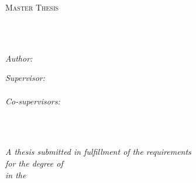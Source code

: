 \documentclass[
11pt, %
oneside, %
english, %
singlespacing, %
headsepline, %
]{MastersDoctoralThesis} %
\author{Hanna \textsc{Pylieva}} %
\begin{document}
\frontmatter %

\pagestyle{plain} %


\begin{titlepage}
\begin{center}

\vspace*{.06\textheight}
{\scshape\LARGE \univname\par}\vspace{1.5cm} %
\textsc{\Large Master Thesis}\\[0.5cm] %

\HRule \\[0.4cm] %
{\huge \bfseries \ttitle\par}\vspace{0.4cm} %
\HRule \\[1.5cm] %
 
\begin{minipage}[t]{0.4\textwidth}
\begin{flushleft} \large
\emph{Author:}\\
{\authorname} %
\end{flushleft}
\end{minipage}
\begin{minipage}[t]{0.4\textwidth}
\begin{flushright} \large
\emph{Supervisor:} \\
{\supname} %
\vfill
\ \\
\emph{Co-supervisors:} \\
{\cosupname}\\
{\seccosupname}
\end{flushright}
\end{minipage}\\[1cm]
 
\vfill

\large \textit{A thesis submitted in fulfillment of the requirements\\ for the degree of \degreename}\\[0.3cm] %
\textit{in the}\\[0.4cm]
\groupname\\\deptname\\[1cm] %
 

\end{center}
\end{titlepage}
\end{document}
